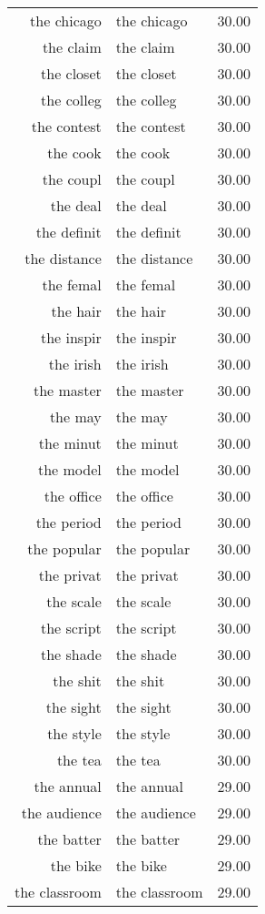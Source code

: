 \begin{table}[ht]
\begin{tabular}{rlr}
  the chicago & the chicago & 30.00 \\ 
  the claim & the claim & 30.00 \\ 
  the closet & the closet & 30.00 \\ 
  the colleg & the colleg & 30.00 \\ 
  the contest & the contest & 30.00 \\ 
  the cook & the cook & 30.00 \\ 
  the coupl & the coupl & 30.00 \\ 
  the deal & the deal & 30.00 \\ 
  the definit & the definit & 30.00 \\ 
  the distance & the distance & 30.00 \\ 
  the femal & the femal & 30.00 \\ 
  the hair & the hair & 30.00 \\ 
  the inspir & the inspir & 30.00 \\ 
  the irish & the irish & 30.00 \\ 
  the master & the master & 30.00 \\ 
  the may & the may & 30.00 \\ 
  the minut & the minut & 30.00 \\ 
  the model & the model & 30.00 \\ 
  the office & the office & 30.00 \\ 
  the period & the period & 30.00 \\ 
  the popular & the popular & 30.00 \\ 
  the privat & the privat & 30.00 \\ 
  the scale & the scale & 30.00 \\ 
  the script & the script & 30.00 \\ 
  the shade & the shade & 30.00 \\ 
  the shit & the shit & 30.00 \\ 
  the sight & the sight & 30.00 \\ 
  the style & the style & 30.00 \\ 
  the tea & the tea & 30.00 \\ 
  the annual & the annual & 29.00 \\ 
  the audience & the audience & 29.00 \\ 
  the batter & the batter & 29.00 \\ 
  the bike & the bike & 29.00 \\ 
  the classroom & the classroom & 29.00 \\ 

\end{tabular}
\end{table}
